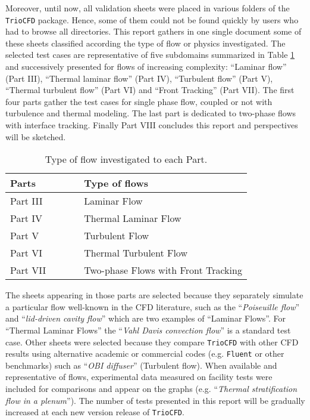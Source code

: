 Moreover, until now, all validation sheets were placed in various
folders of the \texttt{TrioCFD} package. Hence, some of them could not
be found quickly by users who had to browse all directories. This
report gathers in one single document some of these sheets classified according
the type of flow or physics investigated. The selected
test cases are representative of five subdomains summarized in Table
\ref{tab:Type-of-flows} and successively presented for flows
of increasing complexity: \textquotedblleft Laminar flow\textquotedblright{}
(Part III), \textquotedblleft Thermal laminar flow\textquotedblright{}
(Part IV), \textquotedblleft Turbulent flow\textquotedblright{} (Part
V), \textquotedblleft Thermal turbulent flow\textquotedblright{} (Part
VI) and \textquotedblleft Front Tracking\textquotedblright{} (Part
VII). The first four parts gather the test cases for single phase flow,
coupled or not with turbulence and thermal modeling. The
last part is dedicated to two-phase flows with interface tracking.
Finally Part VIII concludes this report and perspectives will be sketched.
\newpage
\vspace{2cm}
\begin{table}[H]
\begin{centering}
\begin{tabular}{lll}
\hline 
\textbf{Parts} & $\qquad$ & \textbf{Type of flows}\tabularnewline
\hline 
Part III &  & Laminar Flow\tabularnewline
Part IV &  & Thermal Laminar Flow\tabularnewline
Part V &  & Turbulent Flow\tabularnewline
Part VI &  & Thermal Turbulent Flow\tabularnewline
Part VII &  & Two-phase Flows with Front Tracking\tabularnewline
\hline 
\end{tabular}
\par\end{centering}
\caption{\label{tab:Type-of-flows}Type of flow investigated to each Part.}
\end{table}

The sheets appearing in those parts are selected because they separately
simulate a particular flow well-known in the CFD literature,
such as the ``\emph{Poiseuille flow}'' and ``\emph{lid-driven cavity
flow}'' which are two examples of ``Laminar Flows''. For ``Thermal
Laminar Flows'' the ``\emph{Vahl Davis convection flow}'' is a
standard test case. Other sheets were selected because they compare
\texttt{TrioCFD} with other CFD results using alternative academic
or commercial codes (e.g. \texttt{Fluent} or other benchmarks) such
as ``\emph{OBI diffuser}'' (Turbulent flow). When available and
representative of flows, experimental data measured on facility tests
were included for comparisons and appear on the graphs (e.g. ``\emph{Thermal
stratification flow in a plenum}''). The number of tests presented in this
report will be gradually increased at each new version release of \texttt{TrioCFD}.\medskip\newline


